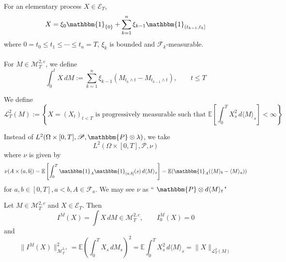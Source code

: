 \documentclass[12pt,a4paper]{article}
\newcommand{\E}{\mathbb{E}}
\begin{document}
\pagebreak
\begin{definition}{}{}
    For an elementary process $X\in\mathcal{E}_T$,
    $$
    X = \xi_0\mathbbm{1}_{\{0\}} + \sum_{k=1}^n \xi_{k-1}\mathbbm{1}_{(t_{k-1},t_k]}
    $$
    where $0=t_0\le t_1\le\cdots\le t_n=T$, $\xi_k$ is bounded and $\mathscr{F}_k$-measurable.\\
    \\
    For $M\in\mathcal{M}^{2,c}_T$, we define
    $$
    \int_0^t X\,dM:= \sum_{k=1}^n\xi_{k-1}(M_{t_k\wedge t}-M_{t_{k-1}\wedge t}),\qquad t\le T
    $$
\end{definition}
\begin{definition}{}{}
    We define
    $$
    \mathcal{L}^2_T(M) := \left\{X=(X_{t})_{t<T} \text{ is progressively measurable such that } \E\left[\int_0^T X_s^2\,d\langle M\rangle_s\right]<\infty\right\}
    $$
\end{definition}
\begin{remark}{}{}
    Instead of $L^2(\Omega\times[0,T], \mathscr{P}, \mathbbm{P}\otimes\lambda)$, we take
    $$
    L^2(\Omega\times[0,T], \mathscr{P}, \nu)
    $$
    where $\nu$ is given by
    $$
    \nu(A\times(a,b]) = \E\left[\int_0^T\mathbbm{1}_A\mathbbm{1}_{(a,b]}(s)\, d\langle M\rangle_s\right] = \E(\mathbbm{1}_A(\langle M\rangle_b-\langle M\rangle_a))
    $$
    for $a,b\in[0,T], a<b, A\in\mathscr{F}_a$. We may see $\nu$ as `` $\mathbbm{P}\otimes d\langle M\rangle_t$"
\end{remark}
\pagebreak
\begin{proposition}{}{}
    Let $M\in\mathcal{M}_T^{2,c}$ and $X\in \mathcal{E}_T$. Then
    $$
    I^M(X) = \int X\,dM \in \mathcal{M}^{2,c}_T, \qquad I^M_0(X)=0
    $$
    and
    $$
    \|I^M(X)\|^2_{\mathcal{M}^{2,c}_T} = \E\left(\int_0^T X_s\, dM_s\right)^2 = \E\int_0^T X_s^2\,d\langle M\rangle_s = \|X\|_{\mathcal{L}^2_T(M)}
    $$
\end{proposition}
\end{document}
